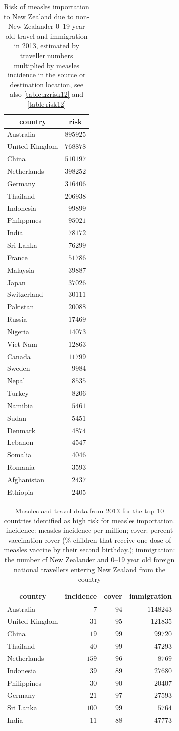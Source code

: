 \documentclass{article}
\begin{document}
\begin{table}
\begin{center}
\begin{tabular}{lr}
\hline\hline
\multicolumn{1}{c}{country}&\multicolumn{1}{c}{risk}\tabularnewline
\hline
Australia&$895925$\tabularnewline
United Kingdom&$768878$\tabularnewline
China&$510197$\tabularnewline
Netherlands&$398252$\tabularnewline
Germany&$316406$\tabularnewline
Thailand&$206938$\tabularnewline
Indonesia&$ 99899$\tabularnewline
Philippines&$ 95021$\tabularnewline
India&$ 78172$\tabularnewline
Sri Lanka&$ 76299$\tabularnewline
France&$ 51786$\tabularnewline
Malaysia&$ 39887$\tabularnewline
Japan&$ 37026$\tabularnewline
Switzerland&$ 30111$\tabularnewline
Pakistan&$ 20088$\tabularnewline
Russia&$ 17469$\tabularnewline
Nigeria&$ 14073$\tabularnewline
Viet Nam&$ 12863$\tabularnewline
Canada&$ 11799$\tabularnewline
Sweden&$  9984$\tabularnewline
Nepal&$  8535$\tabularnewline
Turkey&$  8206$\tabularnewline
Namibia&$  5461$\tabularnewline
Sudan&$  5451$\tabularnewline
Denmark&$  4874$\tabularnewline
Lebanon&$  4547$\tabularnewline
Somalia&$  4046$\tabularnewline
Romania&$  3593$\tabularnewline
Afghanistan&$  2437$\tabularnewline
Ethiopia&$  2405$\tabularnewline
\hline
\end{tabular}\end{center}\caption{Risk of measles importation to New Zealand due to non-New Zealander 0--19 year old travel and immigration in 2013, estimated by traveller numbers multiplied by measles incidence in the source or destination location, see also \autoref{table:nzrisk12} and \autoref{table:risk12}}
\label{table:imrisk12}
\end{table}

\begin{table}
\begin{center}
\begin{tabular}{lrrr}
\hline\hline
\multicolumn{1}{c}{country}&\multicolumn{1}{c}{incidence}&\multicolumn{1}{c}{cover}&\multicolumn{1}{c}{immigration}\tabularnewline
\hline
Australia&$  7$&$94$&$1148243$\tabularnewline
United Kingdom&$ 31$&$95$&$ 121835$\tabularnewline
China&$ 19$&$99$&$  99720$\tabularnewline
Thailand&$ 40$&$99$&$  47293$\tabularnewline
Netherlands&$159$&$96$&$   8769$\tabularnewline
Indonesia&$ 39$&$89$&$  27680$\tabularnewline
Philippines&$ 30$&$90$&$  20407$\tabularnewline
Germany&$ 21$&$97$&$  27593$\tabularnewline
Sri Lanka&$100$&$99$&$   5764$\tabularnewline
India&$ 11$&$88$&$  47773$\tabularnewline
\hline
\end{tabular}\end{center}\caption{Measles and travel data from 2013 for the top 10 countries identified as high risk for measles importation. incidence: measles incidence per million; cover: percent vaccination cover (\% children that receive one dose of measles vaccine by their second birthday.); immigration: the number of New Zealander and 0--19 year old foreign national travellers entering New Zealand from the country}
\label{table:toprisk}
\end{table}
\end{document}
